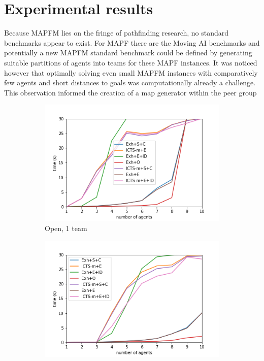 \documentclass[english]{article}
\begin{document}
	\section{Experimental results}
	Because MAPFM lies on the fringe of pathfinding research, no standard benchmarks appear to exist. For MAPF there are the Moving AI benchmarks \cite{sturtevant2012} and potentially a new MAPFM standard benchmark could be defined by generating suitable partitions of agents into teams for these MAPF instances. It was noticed however that optimally solving even small MAPFM instances with comparatively few agents and short distances to goals was computationally already a challenge. This observation informed the creation of a map generator within the peer group  
	
	\begin{figure}
		\centering
		\begin{subfigure}{0.49\textwidth}
			\centering
			\includegraphics[width=\linewidth]{img/results/open-1}
			\caption{Open, 1 team}
			\label{fig:open1}
		\end{subfigure}
		\begin{subfigure}{0.49\textwidth}
		\centering
		\includegraphics[width=\linewidth]{img/results/open-3}

\end{subfigure}
\end{figure}
\end{document}
